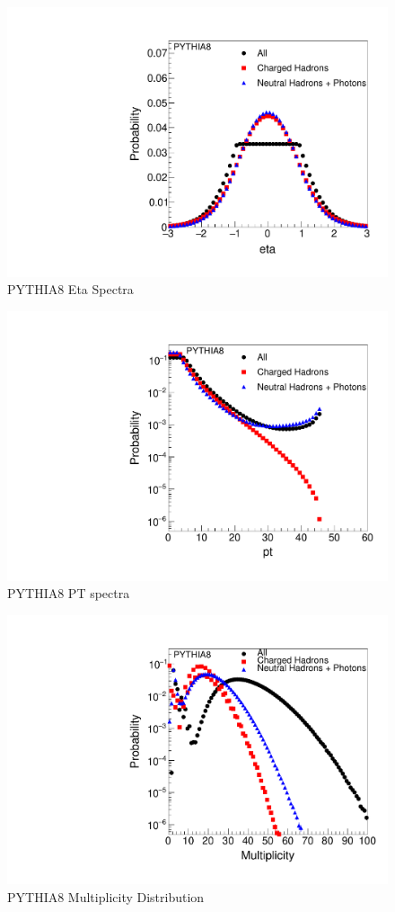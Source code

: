 \begin{figure}[!htb]
\begin{center}
\includegraphics[width=.45\textwidth]{images/DataQualityCheck/PYTHIA8_eta.pdf}
\caption{PYTHIA8 Eta Spectra}
\label{fig:figure7} 
\end{center}
\end{figure}

\begin{figure}[!htb]
\begin{center}
\includegraphics[width=.45\textwidth]{images/DataQualityCheck/PYTHIA8_pt.pdf}
\caption{PYTHIA8 PT spectra}
\label{fig:figure8} 
\end{center}
\end{figure}

\begin{figure}[!htb]
\begin{center}
\includegraphics[width=.45\textwidth]{images/DataQualityCheck/PYTHIA8_mult.pdf}
\caption{PYTHIA8 Multiplicity Distribution}
\label{fig:figure9} 
\end{center}
\end{figure}

